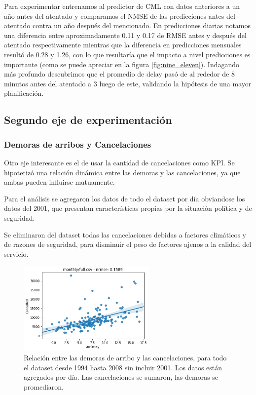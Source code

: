 Para experimentar entrenamos al predictor de CML con datos anteriores a un año antes del atentado y comparamos el NMSE de las predicciones antes del atentado contra un año después del mencionado. En predicciones diarias notamos una diferencia entre aproximadamente 0.11 y 0.17 de RMSE antes y después del atentado respectivamente mientras que la diferencia en predicciones mensuales resultó de 0.28 y 1.26, con lo que resultaría que el impacto a nivel predicciones es importante (como se puede apreciar en la figura \ref{fig:nine_eleven}). Indagando más profundo descubrimos que el promedio de delay pasó de al rededor de 8 minutos antes del atentado a 3 luego de este, validando la hipótesis de una mayor planificación.

\subsection{Segundo eje de experimentación}

\subsubsection{Demoras de arribos y Cancelaciones}

Otro eje interesante es el de usar la cantidad de cancelaciones como
KPI. Se hipotetizó una relación dinámica entre las demoras y las
cancelaciones, ya que ambas pueden influirse mutuamente.

Para el análisis se agregaron los datos de todo el dataset por día
obviandose los datos del 2001, que presentan características propias
por la situación política y de seguridad.

Se eliminaron del dataset todas las cancelaciones debidas a factores
climáticos y de razones de seguridad, para disminuir el peso de
factores ajenos a la calidad del servicio.

\begin{figure}[h]
  \includegraphics[width=0.6\textwidth, height=0.24\textheight]{./img/arrDel_vs_cancell.png}
  \centering
  \caption{ Relación entre las demoras de arribo y las cancelaciones,
    para todo el dataset desde 1994 hasta 2008 sin incluir 2001. Los
    datos están agregados por día. Las cancelaciones se sumaron, las
    demoras se promediaron.  }
  \label{fig:cancell-arrdelay}
\end{figure}

